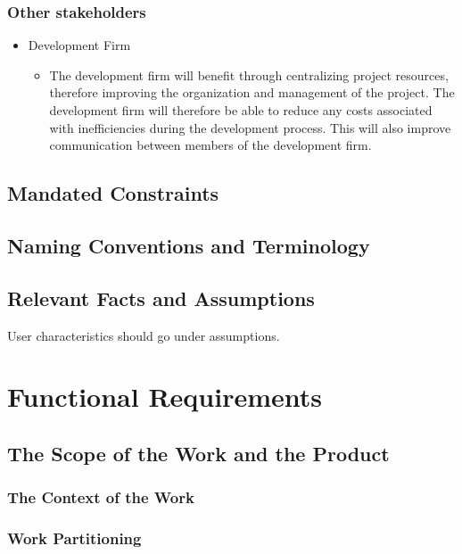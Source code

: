 \documentclass[12pt, titlepage]{article}
\begin{document}
\subsubsection{Other stakeholders}
\begin{itemize}
    \item Development Firm
    \begin{itemize}
      \item[] The development firm will benefit through centralizing project resources, therefore improving the organization and management of the project. The development firm will therefore be able to reduce any costs associated with inefficiencies during the development process. This will also improve communication between members of the development firm.
    \end{itemize}
\end{itemize}

\subsection{Mandated Constraints}

\subsection{Naming Conventions and Terminology}

\subsection{Relevant Facts and Assumptions}

User characteristics should go under assumptions.

\section{Functional Requirements}

\subsection{The Scope of the Work and the Product}

\subsubsection{The Context of the Work}

\subsubsection{Work Partitioning}
\end{document}
